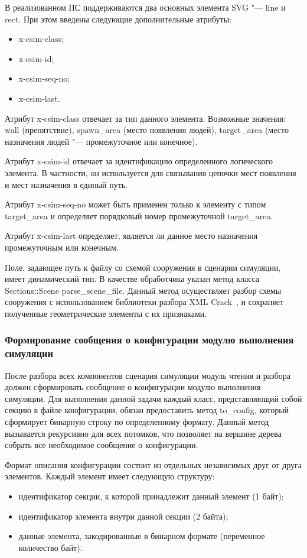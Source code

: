 В реализованном ПС поддерживаются два основных элемента SVG "--- line и rect.
При этом введены следующие дополнительные атрибуты:
\begin{itemize}
  \item x-csim-class;
  \item x-csim-id;
  \item x-csim-seq-no;
  \item x-csim-last.
\end{itemize}

Атрибут x-csim-class отвечает за тип данного элемента.
Возможные значения:
  wall (препятствие),
  spawn\_area (место появления людей),
  target\_area (место назначения людей "--- промежуточное или конечное).

Атрибут x-csim-id отвечает за идентификацию определенного логического элемента.
В частности, он используется для связывания цепочки мест появления и мест назначения в единый путь.

Атрибут x-csim-seq-no может быть применен только к элементу с типом target\_area и определяет порядковый номер промежуточной target\_area.

Атрибут x-csim-last определяет, является ли данное место назначения промежуточным или конечным.

Поле, задающее путь к файлу со схемой сооружения в сценарии симуляции, имеет динамический тип.
В качестве обработчика указан метод класса Sections::Scene parse\_scene\_file.
Данный метод осуществляет разбор схемы сооружения с использованием библиотеки разбора XML Crack~\cite{ruby_crack_gem}, и сохраняет полученные геометрические элементы с их признаками.

\subsubsection{Формирование сообщения о конфигурации модулю выполнения симуляции}
\label{sec:development:preprocessor:format}

После разбора всех компонентов сценария симуляции модуль чтения и разбора должен сформировать сообщение о конфигурации модулю выполнения симуляции.
Для выполнения данной задачи каждый класс, представляющий собой секцию в файле конфигурации, обязан предоставить метод to\_config, который сформирует бинарную строку по определенному формату.
Данный метод вызывается рекурсивно для всех потомков, что позволяет на вершине дерева собрать все необходимое сообщение о конфигурации.

Формат описания конфигурации состоит из отдельных независимых друг от друга элементов.
Каждый элемент имеет следующую структуру:
\begin{itemize}
  \item идентификатор секции, к которой принадлежит данный элемент (1 байт);
  \item идентификатор элемента внутри данной секции (2 байта);
  \item данные элемента, закодированные в бинарном формате (переменное количество байт).
\end{itemize}

